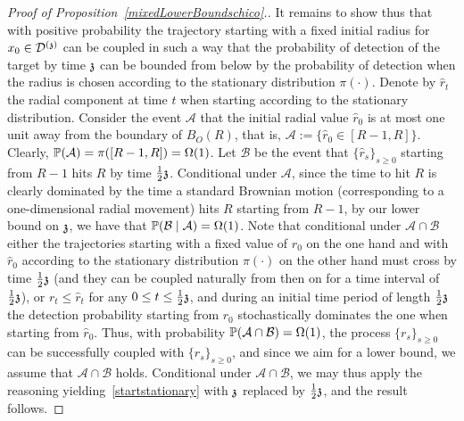 \begin{proof}[Proof of Proposition~\ref{mixedLowerBoundschico}.]
It remains to show thus that with positive probability the trajectory starting with a fixed initial radius for $x_0 \in \dt$ can be coupled in such a way that the probability of detection of the target by time $\ss$ can be bounded from below by the probability of detection when the radius is chosen according to the stationary distribution $\pi(\cdot)$. Denote by $\widehat{r}_t$ the radial component at time $t$ when starting according to the stationary distribution.
Consider the event $\mathcal{A}$ that the initial radial value $\widehat{r}_0$ is at most one unit away from the 
boundary of $B_O(R)$, that is, $\mathcal{A}:=\{\widehat{r}_0\in [R-1,R]\}$.
Clearly, $\PP(\mathcal{A})=\pi([R-1,R])=\Omega(1)$. 
Let $\mathcal{B}$ be the event that $\{\widehat{r}_s\}_{s\geq 0}$ starting from $R-1$ hits $R$ by time $\frac12\ss$. 
Conditional under $\mathcal{A}$, since the time to hit $R$ is clearly dominated by the time a standard  Brownian motion (corresponding to a one-dimensional radial movement) hits $R$ starting from $R-1$, by our lower bound on $\ss$, we have that $\PP(\mathcal{B}\mid \mathcal{A})=\Omega(1)$.  Note that conditional under $\mathcal{A}\cap\mathcal{B}$ either the trajectories starting with a fixed value of $r_0$ on the one hand and with $\widehat{r}_0$ according to the stationary distribution $\pi(\cdot)$ on the other hand must cross by time $\frac12\ss$ (and they can be coupled naturally from then on for a time interval of $\frac12\ss$), or $r_t \le \widehat{r}_t$ for any $0 \le t \le \frac12\ss$, and during an initial time period of length $\frac12\ss$ the detection probability starting from $r_0$ stochastically dominates the one when starting from $\widehat{r}_0$. Thus, with probability $\PP(\mathcal{A}\cap\mathcal{B})=\Omega(1)$, the process $\{r_s\}_{s\geq 0}$ can be successfully coupled with $\{\widehat{r}_s\}_{s\geq 0}$, and since we aim for a lower bound, we assume that $\mathcal{A}\cap\mathcal{B}$ holds. Conditional under $\mathcal{A}\cap\mathcal{B}$, we may thus apply the reasoning yielding~\eqref{startstationary} with $\ss$ replaced by $\frac12\ss$, and the result follows.
\end{proof}



